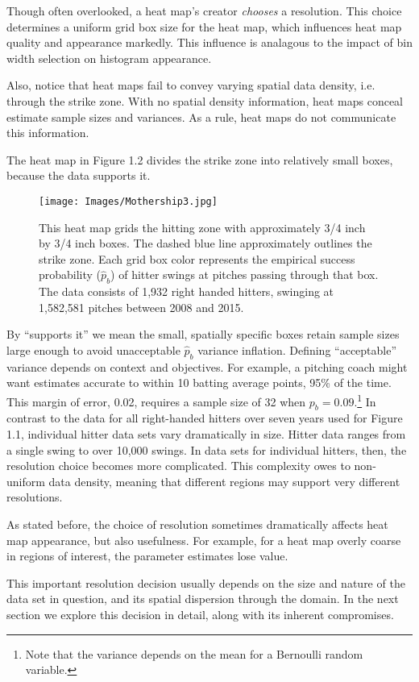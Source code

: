Though often overlooked, a heat map's creator {\it chooses} a resolution. This choice determines a uniform grid box size for the heat map, which influences heat map quality and appearance markedly. This influence is analagous to the impact of bin width selection on histogram appearance. 

Also, notice that heat maps fail to convey varying spatial data density, i.e. through the strike zone. With no spatial density information, heat maps conceal estimate sample sizes and variances.  As a rule, heat maps do not communicate this information.

The heat map in Figure 1.2 divides the strike zone into relatively small boxes, because the data supports it.
  \begin{figure}[H]
	\centering
	\texttt{[image: Images/Mothership3.jpg]} 
  \caption{This heat map grids the hitting zone with approximately 3/4 inch by 3/4 inch boxes. The dashed blue line approximately outlines the strike zone. Each grid box color represents the empirical success probability ($\hat{p}_{b}$) of hitter swings at pitches passing through that box.  The data consists of 1,932 right handed hitters, swinging at 1,582,581 pitches between 2008 and 2015.}
	\end{figure} 
By ``supports it'' we mean the small, spatially specific boxes retain sample sizes large enough to avoid unacceptable $\hat{p}_{b}$ variance inflation. Defining ``acceptable'' variance depends on context and objectives. For example, a pitching coach might want estimates accurate to within 10 batting average points, 95\% of the time. This margin of error, 0.02, requires a sample size of 32 when $p_{b} = 0.09$.\footnote{Note that the variance depends on the mean for a Bernoulli random variable.} In contrast to the data for all right-handed hitters over seven years used for Figure 1.1, individual hitter data sets vary dramatically in size. Hitter data ranges from a single swing to over 10,000 swings. In data sets for individual hitters, then, the resolution choice becomes more complicated. This complexity owes to non-uniform data density, meaning that different regions may support very different resolutions. 

As stated before, the choice of resolution sometimes dramatically affects heat map appearance, but also usefulness. For example, for a heat map overly coarse in regions of interest, the parameter estimates lose value. 

This important resolution decision usually depends on the size and nature of the data set in question, and its spatial dispersion through the domain. In the next section we explore this decision in detail, along with its inherent compromises.

